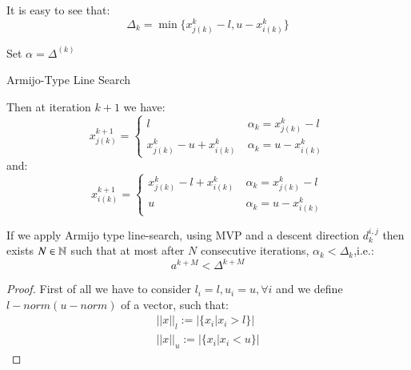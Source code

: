 It is easy to see that:
\begin{equation*}
\Delta_k=\min \{ x^k_{j(k)}-l, u-x^k_{i(k)}\}
\end{equation*}
\begin{algorithm}[ht]
 Set $\alpha = \Delta^{(k)}$\\
 \caption{Armijo-Type Line Search}
\end{algorithm}

Then at iteration $k+1$ we have:
\begin{equation*}
x^{k+1}_{j(k)}=\begin{cases}
 l \ &\alpha_k=x^k_{j(k)}-l\\
 x^k_{j(k)}-u+x^k_{i(k)} \ &\alpha_k=u-x^k_{i(k)}
 \end{cases}
\end{equation*}
and:
\begin{equation*}
x^{k+1}_{i(k)}=\begin{cases}
 x^k_{j(k)}-l+x^k_{i(k)} \ &\alpha_k=x^k_{j(k)}-l\\
 u \ &\alpha_k=u-x^k_{i(k)}
 \end{cases}
\end{equation*}




\begin{proposition}\label{proposition:david}
 If we apply Armijo type line-search, using MVP and a descent direction $d_k^{i,j}$ then exists $N \in \mathbb{N}$ such that at most after $N$ consecutive iterations, $\alpha_k<\Delta_k$,i.e.:
 \begin{equation}
  a^{k+M}<\Delta^{k+M}
 \end{equation}
\end{proposition}
\begin{proof}
First of all we have to consider $l_i = l, u_i=u, \forall i$ and we define $l-norm (u-norm)$ of a vector, such that:
\begin{equation*}
\begin{aligned}
 ||x||_l:= |\{x_i| x_i >l\}| \\
 ||x||_u:= |\{x_i| x_i <u\}| 
 \end{aligned}
\end{equation*}
\end{proof}

